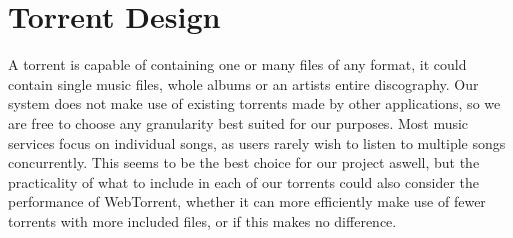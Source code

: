 \section{Torrent Design}
A torrent is capable of containing one or many files of any format, 
it could contain single music files, whole albums or an artists entire discography.
Our system does not make use of existing torrents made by other applications,
so we are free to choose any granularity best suited for our purposes.
Most music services focus on individual songs, 
as users rarely wish to listen to multiple songs concurrently.
This seems to be the best choice for our project aswell, 
but the practicality of what to include in each of our torrents 
could also consider the performance of WebTorrent,
whether it can more efficiently make use of fewer torrents with more included files, 
or if this makes no difference.
